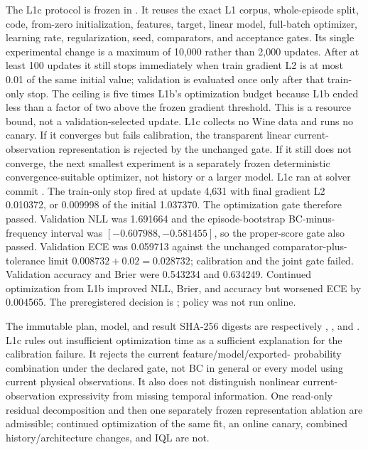 \documentclass[11pt]{article}
\begin{document}
The L1c protocol is frozen in
.  It reuses the exact L1
corpus, whole-episode split, code, from-zero initialization, features, target,
linear model, full-batch optimizer, learning rate, regularization, seed,
comparators, and acceptance gates.  Its single experimental change is a
maximum of 10,000 rather than 2,000 updates.  After at least 100 updates it
still stops immediately when train gradient L2 is at most 0.01 of the same
initial value; validation is evaluated once only after that train-only stop.
The ceiling is five times L1b's optimization budget because L1b ended less
than a factor of two above the frozen gradient threshold.  This is a resource
bound, not a validation-selected update.  L1c collects no Wine data and runs
no canary.  If it converges but fails calibration, the transparent linear
current-observation representation is rejected by the unchanged gate.  If it
still does not converge, the next smallest experiment is a separately frozen
deterministic convergence-suitable optimizer, not history or a larger model.
L1c ran at solver commit
.  The train-only stop fired
at update 4,631 with final gradient L2 0.010372, or 0.009998 of the initial
1.037370.  The optimization gate therefore passed.  Validation NLL was
1.691664 and the episode-bootstrap BC-minus-frequency interval was
$[-0.607988,-0.581455]$, so the proper-score gate also passed.  Validation
ECE was 0.059713 against the unchanged comparator-plus-tolerance limit
$0.008732+0.02=0.028732$; calibration and the joint gate failed.  Validation
accuracy and Brier were 0.543234 and 0.634249.  Continued optimization from
L1b improved NLL, Brier, and accuracy but worsened ECE by 0.004565.  The
preregistered decision is
; policy
 was not run online.

The immutable plan, model, and result SHA-256 digests are respectively
,
,
and
.
L1c rules out insufficient optimization time as a sufficient explanation for
the calibration failure.  It rejects the current feature/model/exported-
probability combination under the declared gate, not BC in general or every
model using current physical observations.  It also does not distinguish
nonlinear current-observation expressivity from missing temporal information.
One read-only residual decomposition and then one separately frozen
representation ablation are admissible; continued optimization of the same fit,
an online canary, combined history/architecture changes, and IQL are not.
\end{document}
